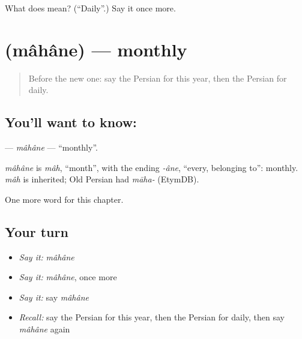 \begin{tcolorbox}[breakable,colback=teal!4,colframe=teal!35!black,title={Before you move on}]
What does  mean? (\textquotedblleft{}Daily\textquotedblright{}.) Say it once more.
\end{tcolorbox}
\section[\texorpdfstring{\fa{ماهانه} (mâhâne)}{ماهانه (mâhâne)}]{ (mâhâne) — monthly}

\label{lesson:FA-C152-mahane}



\begin{quote}
Before the new one: say the Persian for this year, then the Persian for daily.
\end{quote}

\subsection*{You'll want to know: }
\textbf{} — \emph{mâhâne} — \textquotedblleft{}monthly\textquotedblright{}.

\begin{cousinweb}
\emph{mâhâne} is \emph{mâh}, \textquotedblleft{}month\textquotedblright{}, with the ending \emph{-âne}, \textquotedblleft{}every, belonging to\textquotedblright{}: monthly. \emph{mâh} is inherited; Old Persian had \emph{māha-} (EtymDB).
\end{cousinweb}

\begin{grammarlens}[title={What you've built}]
One more word for this chapter.
\end{grammarlens}

\subsection*{Your turn}
\begin{itemize}
\raggedright
  \item \emph{Say it:} \emph{mâhâne}
  \item \emph{Say it:} \emph{mâhâne}, once more
  \item \emph{Say it:} say \emph{mâhâne}
  \item \emph{Recall:} say the Persian for this year, then the Persian for daily, then say \emph{mâhâne} again
\end{itemize}


